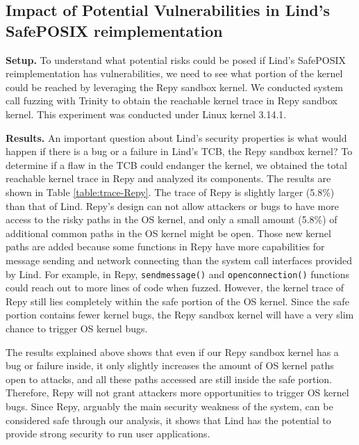 {{{\subsection{Impact of Potential Vulnerabilities in Lind's SafePOSIX reimplementation}
\label{Reachable-Kernel-Trace-Analysis-for-Repy-Sandbox}

\textbf{Setup.}
To understand what potential risks could be posed if Lind's SafePOSIX reimplementation 
has vulnerabilities, we need to see what portion of the kernel could be reached by 
leveraging the Repy sandbox kernel. We conducted system call fuzzing with Trinity 
to obtain the reachable kernel trace in Repy sandbox kernel. 
This experiment was conducted under Linux kernel 3.14.1.

\noindent
\textbf{Results.}
An important question about Lind's security properties is what would happen if
there is a bug or a failure in Lind's TCB,
the Repy sandbox kernel? To determine if a flaw in the TCB could endanger the kernel,
we obtained the total reachable kernel trace in Repy and analyzed its
components.
The results are shown in Table \ref{table:trace-Repy}. The trace of Repy is
slightly larger (5.8\%) than that of Lind.
Repy's design can not allow attackers or bugs to
have more access to the risky paths in the OS kernel, and only a small amount (5.8\%) of
additional common paths in the OS kernel might be open.
Those new kernel paths are added because some functions in Repy
have more capabilities for message sending and network connecting than the system call interfaces
provided by Lind. For example, in Repy,
\texttt{sendmessage()} and \texttt{openconnection()}
functions could reach out to more lines of code when fuzzed. However, the kernel
 trace of Repy still lies completely within the safe
portion of the OS kernel.
Since the safe portion contains fewer kernel bugs, the Repy sandbox kernel
will have a very slim chance to trigger OS kernel bugs.

The results explained above shows that even if our Repy sandbox kernel has a
bug or failure inside,
it only slightly increases the amount of OS kernel paths open to attacks,
and all these paths accessed are still inside the safe portion.
Therefore, Repy will not grant attackers more opportunities to trigger OS
kernel bugs.
Since Repy, arguably the main security weakness of the system, can be
considered safe through our analysis,
it shows that Lind has the potential to provide strong security to run user applications.

}}}
